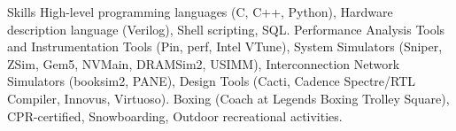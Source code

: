
\begin{rubric}{Skills}
	High-level programming languages (C, C++, Python), Hardware description language (Verilog), Shell scripting, SQL.
	Performance Analysis Tools and Instrumentation Tools (Pin, perf, Intel VTune), System Simulators (Sniper, ZSim, Gem5, NVMain, DRAMSim2, USIMM), Interconnection Network Simulators (booksim2, PANE), Design Tools (Cacti, Cadence Spectre/RTL Compiler, Innovus, Virtuoso).
\entry*[Personal]
	Boxing (Coach at Legends Boxing Trolley Square), CPR-certified, Snowboarding, Outdoor recreational activities.
\end{rubric}
